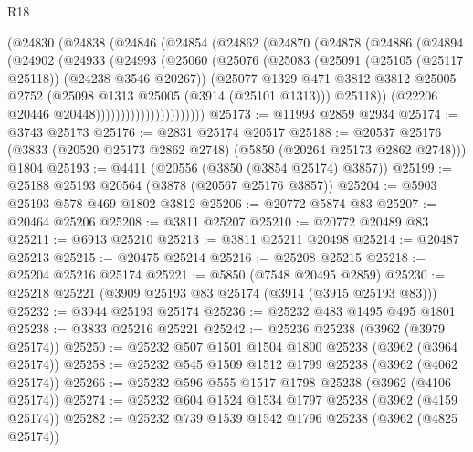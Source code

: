 \begin{lexlean}{R18}
\begin{coremodule}
                  (@24830
                    (@24838
                      (@24846
                        (@24854
                          (@24862
                            (@24870
                              (@24878
                                (@24886
                                  (@24894
                                    (@24902
                                      (@24933
                                        (@24993
                                          (@25060
                                            (@25076
                                              (@25083
                                                (@25091
                                                  (@25105 (@25117 @25118))
                                                  (@24238 @3546 @20267))
                                                (@25077
                                                  @1329
                                                  @471
                                                  @3812
                                                  @3812
                                                  @25005
                                                  @2752
                                                  (@25098 @1313 @25005 (@3914 (@25101 @1313)))
                                                  @25118))
                                              (@22206 @20446 @20448))))))))))))))))))))))
@25173 := @11993 @2859 @2934
@25174 := @3743 @25173
@25176 := @2831 @25174 @20517
@25188 := @20537
    @25176
    (@3833 (@20520 @25173 @2862 @2748) (@5850 (@20264 @25173 @2862 @2748)))
    @1804
@25193 := @4411 (@20556 (@3850 (@3854 @25174) @3857))
@25199 := @25188 @25193 @20564 (@3878 (@20567 @25176 @3857))
@25204 := @5903 @25193 @578 @469 @1802 @3812
@25206 := @20772 @5874 @83
@25207 := @20464 @25206
@25208 := @3811 @25207
@25210 := @20772 @20489 @83
@25211 := @6913 @25210
@25213 := @3811 @25211 @20498
@25214 := @20487 @25213
@25215 := @20475 @25214
@25216 := @25208 @25215
@25218 := @25204 @25216 @25174
@25221 := @5850 (@7548 @20495 @2859)
@25230 := @25218 @25221 (@3909 @25193 @83 @25174 (@3914 (@3915 @25193 @83)))
@25232 := @3944 @25193 @25174
@25236 := @25232 @483 @1495 @495 @1801
@25238 := @3833 @25216 @25221
@25242 := @25236 @25238 (@3962 (@3979 @25174))
@25250 := @25232 @507 @1501 @1504 @1800 @25238 (@3962 (@3964 @25174))
@25258 := @25232 @545 @1509 @1512 @1799 @25238 (@3962 (@4062 @25174))
@25266 := @25232 @596 @555 @1517 @1798 @25238 (@3962 (@4106 @25174))
@25274 := @25232 @604 @1524 @1534 @1797 @25238 (@3962 (@4159 @25174))
@25282 := @25232 @739 @1539 @1542 @1796 @25238 (@3962 (@4825 @25174))

\end{coremodule}
\end{lexlean}

